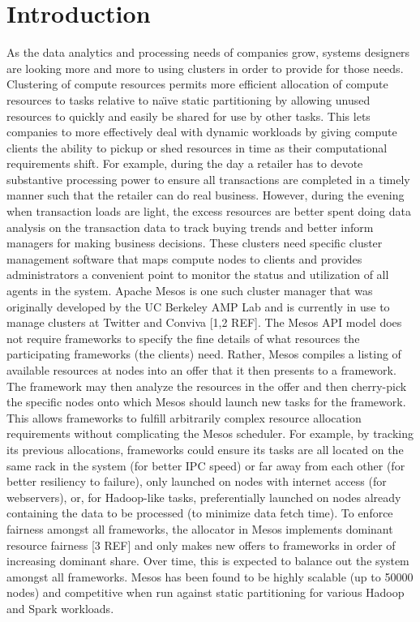 \section{Introduction}
\label{sec:intro}

As the data analytics and processing needs of companies grow, systems designers are looking more and more to using clusters in order to provide for those needs. Clustering of compute resources permits more efficient allocation of compute resources to tasks relative to na\"{\i}ve static partitioning by allowing unused resources to quickly and easily be shared for use by other tasks. This lets companies to more effectively deal with dynamic workloads by giving compute clients the ability to pickup or shed resources in time as their computational requirements shift. For example, during the day a retailer has to devote substantive processing power to ensure all transactions are completed in a timely manner such that the retailer can do real business. However, during the evening when transaction loads are light, the excess resources are better spent doing data analysis on the transaction data to track buying trends and better inform managers for making business decisions. These clusters need specific cluster management software that maps compute nodes to clients and provides administrators a convenient point to monitor the status and utilization of all agents in the system.
Apache Mesos is one such cluster manager that was originally developed by the UC Berkeley AMP Lab and is currently in use to manage clusters at Twitter and Conviva [1,2 REF]. The Mesos API model does not require frameworks to specify the fine details of what resources the participating frameworks (the clients) need. Rather, Mesos compiles a listing of available resources at nodes into an offer that it then presents to a framework. The framework may then analyze the resources in the offer and then cherry-pick the specific nodes onto which Mesos should launch new tasks for the framework. This allows frameworks to fulfill arbitrarily complex resource allocation requirements without complicating the Mesos scheduler. For example, by tracking its previous allocations, frameworks could ensure its tasks are all located on the same rack in the system (for better IPC speed) or far away from each other (for better resiliency to failure), only launched on nodes with internet access (for webservers), or, for Hadoop-like tasks, preferentially launched on nodes already containing the data to be processed (to minimize data fetch time). To enforce fairness amongst all frameworks, the allocator in Mesos implements dominant resource fairness [3 REF] and only makes new offers to frameworks in order of increasing dominant share. Over time, this is expected to balance out the system amongst all frameworks. Mesos has been found to be highly scalable (up to 50000 nodes) and competitive when run against static partitioning for various Hadoop and Spark workloads.
